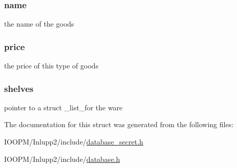 \subsubsection[{name}]{\setlength{\rightskip}{0pt plus 5cm}name}\label{struct__ware___ab74e6bf80237ddc4109968cedc58c151}
the name of the goods \hypertarget{struct__ware___a4dd5ee47dc4a408b73089ec6f8160083}{}
\subsubsection[{price}]{\setlength{\rightskip}{0pt plus 5cm}price}\label{struct__ware___a4dd5ee47dc4a408b73089ec6f8160083}
the price of this type of goods \hypertarget{struct__ware___ab7a0bcbeb6a9e31386e2793fc11552fb}{}
\subsubsection[{shelves}]{\setlength{\rightskip}{0pt plus 5cm}shelves}\label{struct__ware___ab7a0bcbeb6a9e31386e2793fc11552fb}
pointer to a struct \+\_\+list\+\_\+for the ware 

The documentation for this struct was generated from the following files\+:\begin{DoxyCompactItemize}
\item 
I\+O\+O\+P\+M/\+Inlupp2/include/\hyperlink{database__secret_8h}{database\+\_\+secret.\+h}\item 
I\+O\+O\+P\+M/\+Inlupp2/include/\hyperlink{database_8h}{database.\+h}\end{DoxyCompactItemize}

